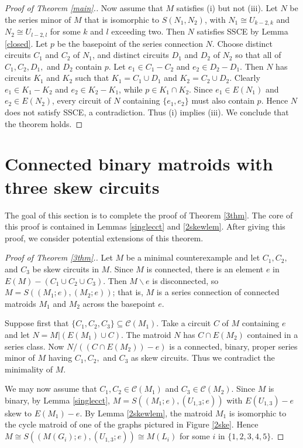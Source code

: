 \documentclass[12pt,reqno]{amsart}
\theoremstyle{definition}
\theoremstyle{remark}
\numberwithin{equation}{section}
\newcommand{\del}{\backslash}
\newcommand{\C}{\mathcal{C}}
\begin{document}
\begin{proof}[Proof of Theorem \ref{main}.]
\qquad

Now assume that $M$ satisfies (i) but not (iii). 
Let $N$ be the series minor of $M$ that is isomorphic to $S(N_1,N_2)$, with $N_1\cong U_{k-2,k}$ and $N_2\cong U_{l-2,l}$ for some $k$ and $l$ exceeding two. 
Then $N$ satisfies SSCE by Lemma \ref{closed}.  
Let $p$ be the basepoint of the series connection $N$. 
Choose distinct circuits $C_1$ and $C_2$ of $N_1$, and distinct circuits $D_1$ and $D_2$ of $N_2$ so that  all of $C_1,C_2,D_1,$ and $D_2$ contain $p$. 
Let $e_1\in C_1-C_2$ and $e_2\in D_2-D_1$. 
Then $N$ has circuits $K_1$ and $K_2$ such that $K_1=C_1\cup D_1$ and $K_2=C_2\cup D_2$. 
Clearly $e_1\in K_1-K_2$ and $e_2\in K_2-K_1$, while $p\in K_1\cap K_2$. 
Since $e_1\in E(N_1)$ and $e_2\in E(N_2)$, every circuit of $N$ containing $\{e_1,e_2\}$ must also contain $p$. 
Hence $N$ does not satisfy SSCE, a contradiction.
Thus (i) implies (iii). We conclude that the theorem holds. 
\end{proof}

\section{Connected binary matroids with three skew circuits}
The goal of this section is to complete the proof of Theorem \ref{3thm}. The core of this proof is contained in Lemmas \ref{singlecct} and \ref{2skewlem}.  After giving this proof, we consider potential extensions of this theorem. 

\begin{proof}[Proof of Theorem \ref{3thm}.]
    Let $M$ be a minimal counterexample and let $C_1,C_2,$ and $C_3$ be skew circuits in $M$. 
    Since $M$ is connected, there is an element $e$ in $E(M)-(C_1\cup C_2\cup C_3)$. 
    Then $M\del e$ is disconnected, so $M=S((M_1;e),(M_2;e))$; that is, $M$ is a series connection of connected matroids $M_1$ and $M_2$ across the basepoint $e$. 

    Suppose first that $\{C_1,C_2,C_3\}\subseteq \C(M_1)$. 
    Take a circuit $C$ of $M$ containing $e$ and let $N=M|(E(M_1)\cup C)$. 
    The matroid $N$ has $C\cap E(M_2)$ contained in a series class. 
    Now $N/((C\cap E(M_2))-e)$ is a connected, binary, proper series minor of $M$ having $C_1,C_2,$ and $C_3$ as skew circuits. 
    Thus we contradict the minimality of $M$. 
        
    We may now assume that $C_1,C_2\in \C(M_1)$ and $C_{3}\in \C(M_2)$.
    Since $M$ is binary, by Lemma \ref{singlecct}, $M=S((M_1;e),(U_{1,3};e))$ with $E(U_{1,3})-e$ skew to $E(M_1)-e$. 
    By Lemma \ref{2skewlem}, the matroid $M_1$ is isomorphic to the cycle matroid of one of the graphs pictured in Figure \ref{2ske}. 
    Hence $M\cong S((M(G_i);e),(U_{1,3};e))\cong  M(L_i)$ for some $i$ in $\{1,2,3,4,5\}$.  
\end{proof}
\end{document}
